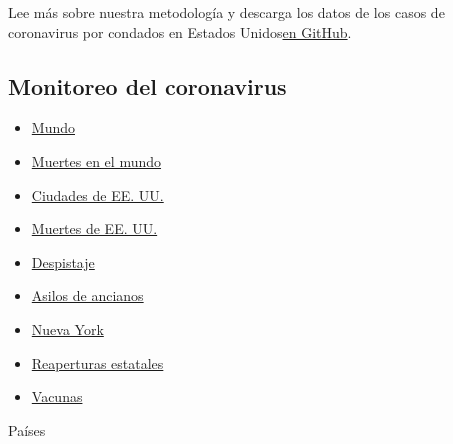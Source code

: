 Lee más sobre nuestra metodología y descarga los datos de los casos de
coronavirus por condados en Estados
Unidos\href{https://github.com/nytimes/covid-19-data}{en GitHub}.

\hypertarget{monitoreo-del-coronavirus}{%
\subsection{Monitoreo del coronavirus}\label{monitoreo-del-coronavirus}}

\begin{itemize}
\tightlist
\item
  \href{https://www.nytimes3xbfgragh.onion/interactive/2020/world/coronavirus-maps.html}{Mundo}
\item
  \href{https://www.nytimes3xbfgragh.onion/interactive/2020/04/21/world/coronavirus-missing-deaths.html}{Muertes
  en el mundo}
\item
  \href{https://www.nytimes3xbfgragh.onion/interactive/2020/04/23/upshot/five-ways-to-monitor-coronavirus-outbreak-us.html}{Ciudades
  de EE. UU.}
\item
  \href{https://www.nytimes3xbfgragh.onion/interactive/2020/05/05/us/coronavirus-death-toll-us.html}{Muertes
  de EE. UU.}
\item
  \href{https://www.nytimes3xbfgragh.onion/interactive/2020/us/coronavirus-testing.html}{Despistaje}
\item
  \href{https://www.nytimes3xbfgragh.onion/interactive/2020/us/coronavirus-nursing-homes.html}{Asilos
  de ancianos}
\item
  \href{https://www.nytimes3xbfgragh.onion/interactive/2020/nyregion/new-york-city-coronavirus-cases.html}{Nueva
  York}
\item
  \href{https://www.nytimes3xbfgragh.onion/interactive/2020/us/states-reopen-map-coronavirus.html}{Reaperturas
  estatales}
\item
  \href{https://www.nytimes3xbfgragh.onion/interactive/2020/science/coronavirus-vaccine-tracker.html}{Vacunas}
\end{itemize}

Países


